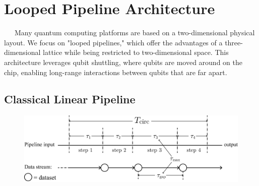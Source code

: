 \documentclass[a4paper,11pt]{ltjsarticle}
\begin{document}
\section{Looped Pipeline Architecture}\label{looped_pipeline}{
    \ \ \ Many quantum computing platforms are based on a two-dimensional physical layout. We focus on "looped pipelines," \cite{cai2023} which offer the advantages of a three-dimensional lattice while being restricted to two-dimensional space. This architecture leverages qubit shuttling, where qubits are moved around on the chip, enabling long-range interactions between qubits that are far apart. 

    \subsection{Classical Linear Pipeline}{

        \begin{figure}[h]
            \centering
            \includegraphics[scale=0.40]{figure/classical_pipeline.eps}
            \vspace{-20pt}\caption{}
            \label{classical_pipeline}
            \vspace{-10pt}
        \end{figure}

}}
\end{document}
